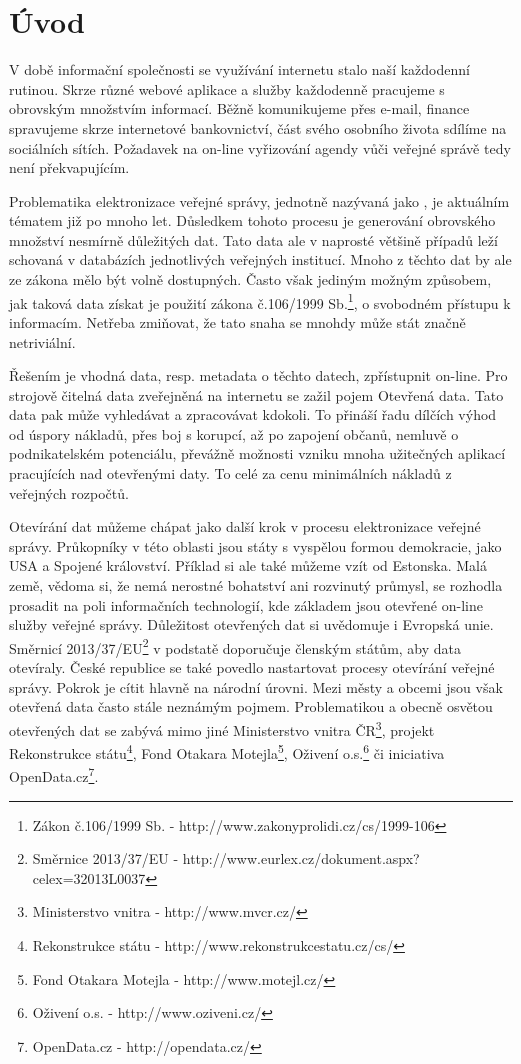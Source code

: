 \chapter{Úvod}

V době informační společnosti se využívání internetu stalo naší každodenní rutinou. Skrze různé webové aplikace a služby každodenně pracujeme s obrovským množstvím informací. Běžně komunikujeme přes e-mail, finance spravujeme skrze internetové bankovnictví, část svého osobního života sdílíme na sociálních sítích. Požadavek na on-line vyřizování agendy vůči veřejné správě tedy není překvapujícím.

Problematika elektronizace veřejné správy, jednotně nazývaná jako , je aktuálním tématem již po mnoho let. Důsledkem tohoto procesu je generování obrovského množství nesmírně důležitých dat. Tato data ale v naprosté většině případů leží schovaná v databázích jednotlivých veřejných institucí. Mnoho z těchto dat by ale ze zákona mělo být volně dostupných. Často však jediným možným způsobem, jak taková data získat je použití zákona č.106/1999 Sb.\footnote{Zákon č.106/1999 Sb. - http://www.zakonyprolidi.cz/cs/1999-106}, o svobodném přístupu k informacím. Netřeba zmiňovat, že tato snaha se mnohdy může stát značně netriviální.

Řešením je vhodná data, resp. metadata o těchto datech, zpřístupnit on-line. Pro strojově čitelná data zveřejněná na internetu se zažil pojem Otevřená data. Tato data pak může vyhledávat a zpracovávat kdokoli. To přináší řadu dílčích výhod od úspory nákladů, přes boj s korupcí, až po zapojení občanů, nemluvě o podnikatelském potenciálu, převážně možnosti vzniku mnoha užitečných aplikací pracujících nad otevřenými daty. To celé za cenu minimálních nákladů z veřejných rozpočtů.

Otevírání dat můžeme chápat jako další krok v procesu elektronizace veřejné správy. Průkopníky v této oblasti jsou státy s vyspělou formou demokracie, jako USA a Spojené království. Příklad si ale také můžeme vzít od Estonska. Malá země, vědoma si, že nemá nerostné bohatství ani rozvinutý průmysl, se rozhodla prosadit na poli informačních technologií, kde základem jsou otevřené on-line služby veřejné správy. Důležitost otevřených dat si uvědomuje i Evropská unie. Směrnicí 2013/37/EU\footnote{Směrnice 2013/37/EU - http://www.eurlex.cz/dokument.aspx?celex=32013L0037} v podstatě doporučuje členským státům, aby data otevíraly. 
České republice se také povedlo nastartovat procesy otevírání veřejné správy. Pokrok je cítit hlavně na národní úrovni. Mezi městy a obcemi jsou však otevřená data často stále neznámým pojmem. Problematikou a obecně osvětou otevřených dat se zabývá mimo jiné Ministerstvo vnitra ČR\footnote{Ministerstvo vnitra - http://www.mvcr.cz/}, projekt Rekonstrukce státu\footnote{Rekonstrukce státu - http://www.rekonstrukcestatu.cz/cs/}, Fond Otakara Motejla\footnote{Fond Otakara Motejla - http://www.motejl.cz/}, Oživení o.s.\footnote{Oživení o.s. - http://www.oziveni.cz/} či iniciativa OpenData.cz\footnote{OpenData.cz - http://opendata.cz/}.

